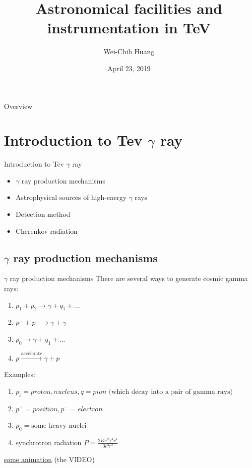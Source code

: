 \documentclass{beamer}
\title[TeV Astrophysics]{Astronomical facilities and instrumentation in TeV}
\author{Wei-Chih Huang}
\institute[NTHU]{
National Tsing Hua University \\
\medskip
}
\date{April 23, 2019}
\begin{document}
\begin{frame}
	\titlepage %
\end{frame}

\begin{frame}{Overview}
	\tableofcontents
\end{frame}



\section{Introduction to Tev $\gamma$ ray}
\begin{frame}{Introduction to Tev $\gamma$ ray}
	\begin{itemize}
		\item $\gamma$ ray production mechanisms
		\item Astrophysical sources of high-energy $\gamma$ rays
		\item Detection method
		\item Cherenkov radiation
	\end{itemize}
\end{frame}


\subsection{$\gamma$ ray production mechanisms}
\begin{frame}{$\gamma$ ray production mechanisms}
	There are several ways to generate cosmic gamma rays:
	\begin{enumerate}
		\item $p_1 + p_2 \rightarrow \gamma + q_1 + ...$
		\item $p^+ + p^- \rightarrow \gamma + \gamma$
		\item $p_0 \rightarrow \gamma + q_1 + ...$
		\item $p \xrightarrow{\text{accelerate}} \gamma + p$
	\end{enumerate}

	Examples:
	\begin{enumerate}
		\item $p_i = proton, nucleus, q = pion \text{ (which decay into a pair of gamma rays)}$
		\item $p^+ = position, p^- = electron$
		\item $p_0 = \text{some heavy nuclei}$
		\item synchrotron radiation $P = \frac{2Ke^2 \gamma^4 v^4}{3c^3r^2} $
	\end{enumerate}
	\href{https://imagine.gsfc.nasa.gov/science/toolbox/gamma_generation.html}{some animation}
	(the VIDEO)
\end{frame}
\end{document}
